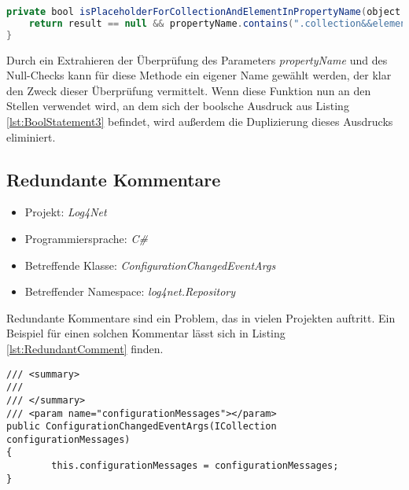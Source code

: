 \begin{lstlisting}[language=Java, caption=Eigene Methode für boolschen Ausdruck, label=lst:BoolStatement4]
private bool isPlaceholderForCollectionAndElementInPropertyName(object result, String propertyName) {
	return result == null && propertyName.contains(".collection&&element.");
}
\end{lstlisting}

\SuperPar Durch ein Extrahieren der Überprüfung des Parameters \textit{propertyName} und des Null-Checks kann für diese Methode ein eigener Name gewählt werden, der klar den Zweck dieser Überprüfung vermittelt. Wenn diese Funktion nun an den Stellen verwendet wird, an dem sich der boolsche Ausdruck aus Listing \ref{lst:BoolStatement3} befindet, wird außerdem die Duplizierung dieses Ausdrucks eliminiert.

\subsection{Redundante Kommentare}
\begin{itemize}
	\item Projekt: \textit{Log4Net}
	\item Programmiersprache: \textit{C\#}
	\item Betreffende Klasse: \textit{ConfigurationChangedEventArgs}
	\item Betreffender Namespace: \textit{log4net.Repository}
\end{itemize}

\SuperPar Redundante Kommentare sind ein Problem, das in vielen Projekten auftritt. Ein Beispiel für einen solchen Kommentar lässt sich in Listing \ref{lst:RedundantComment}  finden.


\begin{lstlisting}[language={[Sharp]C}, caption=Beispiel für einen redundanten Kommentare, label=lst:RedundantComment]
/// <summary>
/// 
/// </summary>
/// <param name="configurationMessages"></param>
public ConfigurationChangedEventArgs(ICollection configurationMessages)
{
		this.configurationMessages = configurationMessages;
}
\end{lstlisting}

